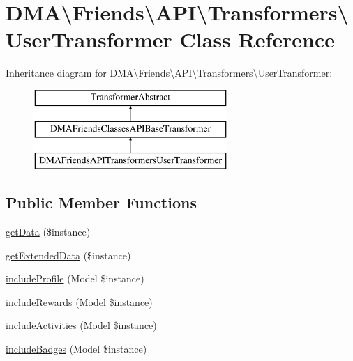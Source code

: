 \hypertarget{classDMA_1_1Friends_1_1API_1_1Transformers_1_1UserTransformer}{}\section{D\+M\+A\textbackslash{}Friends\textbackslash{}A\+P\+I\textbackslash{}Transformers\textbackslash{}User\+Transformer Class Reference}
\label{classDMA_1_1Friends_1_1API_1_1Transformers_1_1UserTransformer}
Inheritance diagram for D\+M\+A\textbackslash{}Friends\textbackslash{}A\+P\+I\textbackslash{}Transformers\textbackslash{}User\+Transformer\+:\begin{figure}[H]
\begin{center}
\leavevmode
\includegraphics[height=3.000000cm]{d3/dfe/classDMA_1_1Friends_1_1API_1_1Transformers_1_1UserTransformer}
\end{center}
\end{figure}
\subsection*{Public Member Functions}
\begin{DoxyCompactItemize}
\item 
\hyperlink{classDMA_1_1Friends_1_1API_1_1Transformers_1_1UserTransformer_a00a7549e59791ab776f1acc1b1da204f}{get\+Data} (\$instance)
\item 
\hyperlink{classDMA_1_1Friends_1_1API_1_1Transformers_1_1UserTransformer_abb4a5b87721f5caca79874bc98147e69}{get\+Extended\+Data} (\$instance)
\item 
\hyperlink{classDMA_1_1Friends_1_1API_1_1Transformers_1_1UserTransformer_a0c0f66cc4dd01370a28522286c1b06cb}{include\+Profile} (Model \$instance)
\item 
\hyperlink{classDMA_1_1Friends_1_1API_1_1Transformers_1_1UserTransformer_ac6526f06acc7cb08fc9818a8c18f3f8c}{include\+Rewards} (Model \$instance)
\item 
\hyperlink{classDMA_1_1Friends_1_1API_1_1Transformers_1_1UserTransformer_a4a7b717ef0fbf0ad65f32f716e7b1ca8}{include\+Activities} (Model \$instance)
\item 
\hyperlink{classDMA_1_1Friends_1_1API_1_1Transformers_1_1UserTransformer_aea162dae412a9207f5ccbf217992df4d}{include\+Badges} (Model \$instance)
\end{DoxyCompactItemize}
